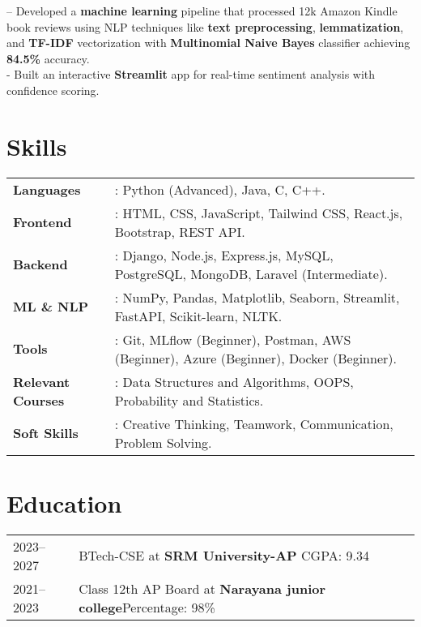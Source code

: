 \documentclass[a4paper,11pt]{article}
\begin{document}
– Developed a \textbf{machine learning} pipeline that processed 12k Amazon Kindle book reviews using NLP techniques like \textbf{text preprocessing}, \textbf{lemmatization}, and \textbf{TF-IDF} vectorization with \textbf{Multinomial Naive Bayes} classifier achieving \textbf{84.5\%} accuracy. \\
- Built an interactive \textbf{Streamlit} app for real-time sentiment analysis with confidence scoring.\\ [-10 pt]
\section*{Skills}
\begin{tabular}{@{}l l@{}}
\textbf{Languages}       & : Python (Advanced), Java, C, C++. \\
\textbf{Frontend}        & : HTML, CSS, JavaScript, Tailwind CSS, React.js, Bootstrap, REST API. \\
\textbf{Backend}         & : Django, Node.js, Express.js, MySQL, PostgreSQL, MongoDB, Laravel (Intermediate). \\
\textbf{ML \& NLP}       & : NumPy, Pandas, Matplotlib, Seaborn, Streamlit, FastAPI, Scikit-learn, NLTK. \\
\textbf{Tools}           & : Git, MLflow (Beginner), Postman, AWS (Beginner), Azure (Beginner), Docker (Beginner). \\
\textbf{Relevant Courses}& : Data Structures and Algorithms, OOPS, Probability and Statistics. \\
\textbf{Soft Skills}     & : Creative Thinking, Teamwork, Communication, Problem Solving. \\
\end{tabular}

    
\section{Education}
\begin{tabularx}{\linewidth}{@{}l X@{}}
2023--2027 & BTech-CSE at \textbf{SRM University-AP} \hfill CGPA: 9.34 \\
2021--2023 & Class 12th AP Board at \textbf{Narayana junior college}\hfill Percentage: 98\% \\
\end{tabularx}
\end{document}
